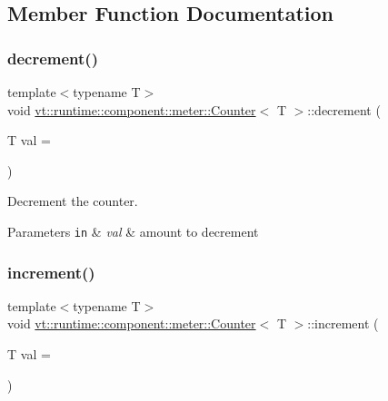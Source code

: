 \subsection{Member Function Documentation}
\mbox{\label{structvt_1_1runtime_1_1component_1_1meter_1_1_counter_a020d52d2540855c661003bb50265e7db}} 
\subsubsection{\texorpdfstring{decrement()}{decrement()}}
{\footnotesize\ttfamily template$<$typename T$>$ \\
void \hyperlink{structvt_1_1runtime_1_1component_1_1meter_1_1_counter}{vt\+::runtime\+::component\+::meter\+::\+Counter}$<$ T $>$\+::decrement (\begin{DoxyParamCaption}\item[{T}]{val = {} }\end{DoxyParamCaption})\hspace{0.3cm}{\ttfamily [inline]}}



Decrement the counter. 


\begin{DoxyParams}[1]{Parameters}
\mbox{\tt in}  & {\em val} & amount to decrement \\
\hline
\end{DoxyParams}
\mbox{\label{structvt_1_1runtime_1_1component_1_1meter_1_1_counter_a5bd034dd4cc31c824242ac92e6cdeaee}} 
\subsubsection{\texorpdfstring{increment()}{increment()}}
{\footnotesize\ttfamily template$<$typename T$>$ \\
void \hyperlink{structvt_1_1runtime_1_1component_1_1meter_1_1_counter}{vt\+::runtime\+::component\+::meter\+::\+Counter}$<$ T $>$\+::increment (\begin{DoxyParamCaption}\item[{T}]{val = {} }\end{DoxyParamCaption})\hspace{0.3cm}{\ttfamily [inline]}}



